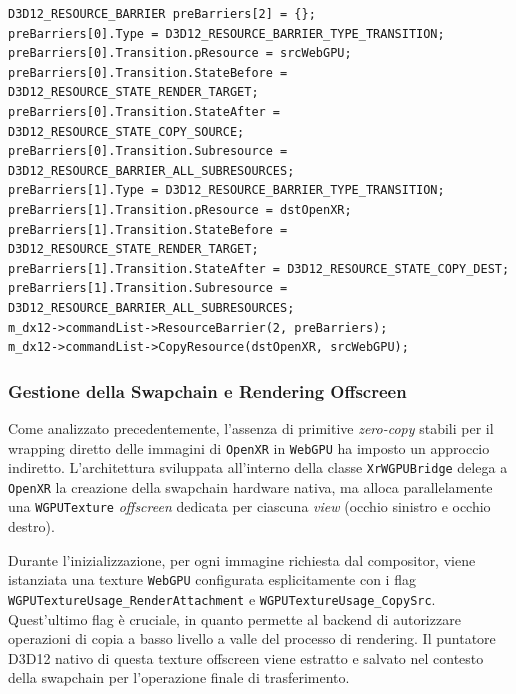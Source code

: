 \documentclass[a4paper, 11pt, twoside]{report}
\begin{document}
\begin{listing}[!ht]
\begin{verbatim}
D3D12_RESOURCE_BARRIER preBarriers[2] = {};
preBarriers[0].Type = D3D12_RESOURCE_BARRIER_TYPE_TRANSITION;
preBarriers[0].Transition.pResource = srcWebGPU;
preBarriers[0].Transition.StateBefore = D3D12_RESOURCE_STATE_RENDER_TARGET;
preBarriers[0].Transition.StateAfter = D3D12_RESOURCE_STATE_COPY_SOURCE;
preBarriers[0].Transition.Subresource = D3D12_RESOURCE_BARRIER_ALL_SUBRESOURCES;
preBarriers[1].Type = D3D12_RESOURCE_BARRIER_TYPE_TRANSITION;
preBarriers[1].Transition.pResource = dstOpenXR;
preBarriers[1].Transition.StateBefore = D3D12_RESOURCE_STATE_RENDER_TARGET;
preBarriers[1].Transition.StateAfter = D3D12_RESOURCE_STATE_COPY_DEST;
preBarriers[1].Transition.Subresource = D3D12_RESOURCE_BARRIER_ALL_SUBRESOURCES;
m_dx12->commandList->ResourceBarrier(2, preBarriers);
m_dx12->commandList->CopyResource(dstOpenXR, srcWebGPU);
\end{verbatim}
\vspace{-0.75cm}
\caption{Gestione degli stati di memoria tramite D3D12 Resource Barriers}
\label{listing:resourcebarriers}
\end{listing}

\pagebreak

\subsubsection{Gestione della Swapchain e Rendering Offscreen}

Come analizzato precedentemente, l'assenza di primitive \textit{zero-copy} stabili per il wrapping diretto delle
immagini di \texttt{\gls{OpenXR}} in \texttt{WebGPU} ha imposto un approccio indiretto. L'architettura sviluppata
all'interno della classe \texttt{XrWGPUBridge} delega a \texttt{\gls{OpenXR}} la creazione della swapchain hardware
nativa, ma alloca parallelamente una \texttt{WGPUTexture} \textit{offscreen} dedicata per ciascuna \textit{view} (occhio
sinistro e occhio destro).

Durante l'inizializzazione, per ogni immagine richiesta dal compositor, viene istanziata una texture \texttt{WebGPU}
configurata esplicitamente con i flag \texttt{WGPUTextureUsage\_RenderAttachment} e \texttt{WGPUTextureUsage\_CopySrc}.
Quest'ultimo flag è cruciale, in quanto permette al backend di autorizzare operazioni di copia a basso livello a valle
del processo di rendering. Il puntatore D3D12 nativo di questa texture offscreen viene estratto e salvato nel contesto
della swapchain per l'operazione finale di trasferimento.
\end{document}
